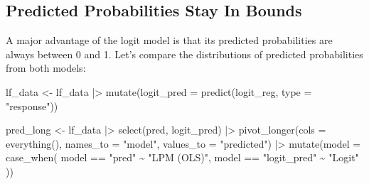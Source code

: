 \documentclass[
  letterpaper,
  DIV=11,
  numbers=noendperiod]{scrreprt}
\newenvironment{Shaded}{\begin{snugshade}}{\end{snugshade}}
\newcommand{\AttributeTok}[1]{\textcolor[rgb]{0.40,0.45,0.13}{#1}}
\newcommand{\FunctionTok}[1]{\textcolor[rgb]{0.28,0.35,0.67}{#1}}
\newcommand{\NormalTok}[1]{\textcolor[rgb]{0.00,0.23,0.31}{#1}}
\newcommand{\OtherTok}[1]{\textcolor[rgb]{0.00,0.23,0.31}{#1}}
\newcommand{\SpecialCharTok}[1]{\textcolor[rgb]{0.37,0.37,0.37}{#1}}
\newcommand{\StringTok}[1]{\textcolor[rgb]{0.13,0.47,0.30}{#1}}
\begin{document}
\subsection{Predicted Probabilities Stay In
Bounds}\label{predicted-probabilities-stay-in-bounds}

A major advantage of the logit model is that its predicted probabilities
are always between 0 and 1. Let's compare the distributions of predicted
probabilities from both models:

\begin{Shaded}
\begin{Highlighting}[]
\NormalTok{lf\_data }\OtherTok{\textless{}{-}}\NormalTok{ lf\_data }\SpecialCharTok{|\textgreater{}}
    \FunctionTok{mutate}\NormalTok{(}\AttributeTok{logit\_pred =} \FunctionTok{predict}\NormalTok{(logit\_reg, }\AttributeTok{type =} \StringTok{"response"}\NormalTok{))}

\NormalTok{pred\_long }\OtherTok{\textless{}{-}}\NormalTok{ lf\_data }\SpecialCharTok{|\textgreater{}}
    \FunctionTok{select}\NormalTok{(pred, logit\_pred) }\SpecialCharTok{|\textgreater{}}
    \FunctionTok{pivot\_longer}\NormalTok{(}\AttributeTok{cols =} \FunctionTok{everything}\NormalTok{(),}
                 \AttributeTok{names\_to =} \StringTok{"model"}\NormalTok{,}
                 \AttributeTok{values\_to =} \StringTok{"predicted"}\NormalTok{) }\SpecialCharTok{|\textgreater{}}
    \FunctionTok{mutate}\NormalTok{(}\AttributeTok{model =} \FunctionTok{case\_when}\NormalTok{(}
\NormalTok{        model }\SpecialCharTok{==} \StringTok{"pred"} \SpecialCharTok{\textasciitilde{}} \StringTok{"LPM (OLS)"}\NormalTok{,}
\NormalTok{        model }\SpecialCharTok{==} \StringTok{"logit\_pred"} \SpecialCharTok{\textasciitilde{}} \StringTok{"Logit"}
\NormalTok{    ))}


\end{Highlighting}
\end{Shaded}
\end{document}
